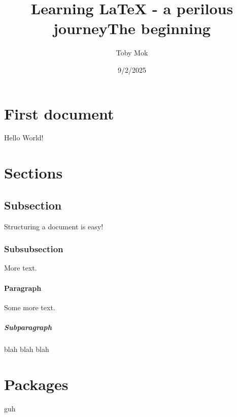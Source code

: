 \documentclass{article}
\title{Learning LaTeX - a perilous journey}
\date{9/2/2025}
\author{Toby Mok}
\begin{document}

\maketitle
{}

\newpage
\doublespacing
\tableofcontents
\singlespacing

\newpage
{}

\title{The beginning}

\section{First document}
Hello World!\

\section{Sections}
\subsection{Subsection}
Structuring a document is easy!

\subsubsection{Subsubsection}
More text.

\paragraph{Paragraph}
Some more text.

\subparagraph{Subparagraph}
blah blah blah

\section{Packages}
guh
\end{document}
